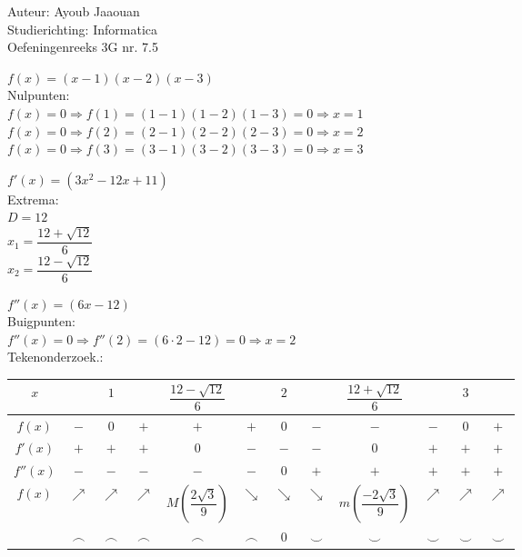 \documentclass[a4paper]{article}
\begin{document}
\noindent \large Auteur: Ayoub Jaaouan \\
\noindent \large Studierichting: Informatica\\
\noindent \large Oefeningenreeks 3G nr. 7.5\\

\medskip

\normalsize

$f(x) = (x-1)(x-2)(x-3)$ \\

Nulpunten: \\

$f(x) = 0 \Rightarrow f(1) = (1-1)(1-2)(1-3) = 0 \Rightarrow x = 1$ \\

$f(x) = 0 \Rightarrow f(2) = (2-1)(2-2)(2-3) = 0 \Rightarrow x = 2$ \\

$f(x) = 0 \Rightarrow f(3) = (3-1)(3-2)(3-3) = 0 \Rightarrow x = 3$ \\

\bigskip

$f'(x) = (3x^2-12x+11) $\\

Extrema: \\

$D = 12$\\

$x_1 = \dfrac{12+\sqrt{12}}{6}$\\

$x_2 = \dfrac{12-\sqrt{12}}{6}$\\



\bigskip

$f''(x) = (6x-12) $\\

Buigpunten: \\

$f''(x) = 0 \Rightarrow f''(2) =  (6\cdot2-12) = 0 \Rightarrow x = 2 $ \\

Tekenonderzoek.: \\

\begin{tabular}{c|ccccccccccc}
$x$				&		& $1$ &  & $\dfrac{12-\sqrt{12}}{6}$ &  & $2$ &  & $\dfrac{12+\sqrt{12}}{6}$ &  & $3$ & \\ \hline
$f(x)$		& $-$ & $0$ & $+$ & $+$ & $+$ & $0$ & $-$ & $-$ & $-$ & $0$ & $+$ \\
$f'(x)$		& $+$ & $+$ & $+$ & $0$ & $-$ & $-$ & $-$ & $0$ & $+$ & $+$ & $+$ \\
$f''(x)$	& $-$ & $-$ & $-$ & $-$ & $-$ & $0$ & $+$ & $+$ & $+$ & $+$ & $+$ \\ \hline
$f(x)$		& $\nearrow$ & $\nearrow$ & $\nearrow$ & $M\left(\dfrac{2\sqrt{3}}{9}\right)$ & $\searrow$ & $\searrow$ &$\searrow$ & $m\left(\dfrac{-2\sqrt{3}}{9}\right)$ & $\nearrow$ & $\nearrow$ & $\nearrow$ \\
					& $\frown$ & $\frown$ & $\frown$ & $\frown$ & $\frown$ & $0$ & $\smile$ & $\smile$ & $\smile$ & $\smile$ & $\smile$ \\
\end{tabular}  \\
\end{document}
